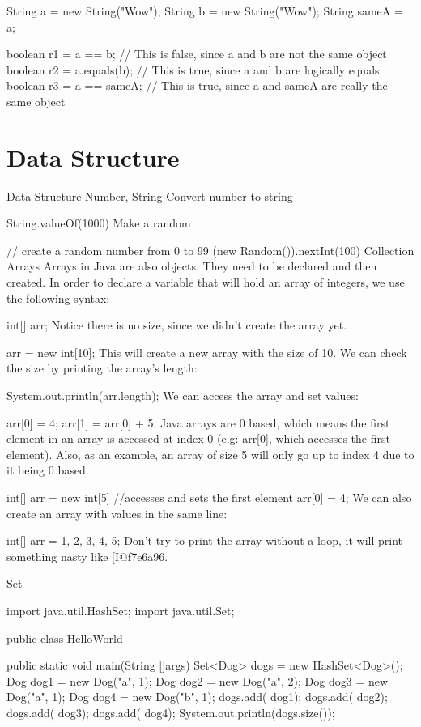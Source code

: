 String a = new String("Wow");
String b = new String("Wow");
String sameA = a;

boolean r1 = a == b;      // This is false, since a and b are not the same object
boolean r2 = a.equals(b); // This is true, since a and b are logically equals
boolean r3 = a == sameA;  // This is true, since a and sameA are really the same object

\section{Data Structure}

Data Structure
Number, String
Convert number to string

String.valueOf(1000)
Make a random

// create a random number from 0 to 99
(new Random()).nextInt(100)
Collection
Arrays
Arrays in Java are also objects. They need to be declared and then created. In order to declare a variable that will hold an array of integers, we use the following syntax:

int[] arr;
Notice there is no size, since we didn't create the array yet.

arr = new int[10];
This will create a new array with the size of 10. We can check the size by printing the array's length:

System.out.println(arr.length);
We can access the array and set values:

arr[0] = 4;
arr[1] = arr[0] + 5;
Java arrays are 0 based, which means the first element in an array is accessed at index 0 (e.g: arr[0], which accesses the first element). Also, as an example, an array of size 5 will only go up to index 4 due to it being 0 based.

int[] arr = new int[5]
//accesses and sets the first element
arr[0] = 4;
We can also create an array with values in the same line:

int[] arr = {1, 2, 3, 4, 5};
Don't try to print the array without a loop, it will print something nasty like [I@f7e6a96.

Set

import java.util.HashSet;
import java.util.Set;

public class HelloWorld{

     public static void main(String []args){
         Set<Dog> dogs = new  HashSet<Dog>();
         Dog dog1 = new Dog("a", 1);
         Dog dog2 = new Dog("a", 2);
         Dog dog3 = new Dog("a", 1);
         Dog dog4 = new Dog("b", 1);
         dogs.add( dog1);
         dogs.add( dog2);
         dogs.add( dog3);
         dogs.add( dog4);
        System.out.println(dogs.size());
     }
}

